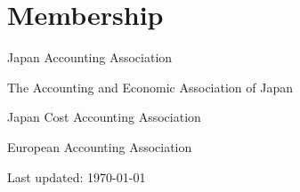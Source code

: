 \documentclass[letterpaper,uplatex]{article}
\def\footerlink{http://jblevins.org/projects/cv-template/}
\renewenvironment{itemize}{
  \begin{list}{}{
    \setlength{\leftmargin}{1.5em}
  }
}{
  \end{list}
}
\begin{document}
\section*{Membership}

\begin{itemize}
\item Japan Accounting Association
\item The Accounting and Economic Association of Japan
\item Japan Cost Accounting Association
\item European Accounting Association
\end{itemize}

\bigskip

\begin{center}
  \begin{footnotesize}
    Last updated: \today \\
  \end{footnotesize}
\end{center}
\end{document}
